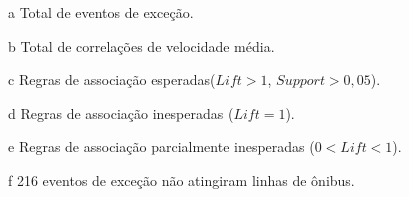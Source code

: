 \documentclass[
	12pt,				%
	oneside,			%
	a4paper,			%
	english,			%
	brazil				%
	]{abntex2ppgsi}
\begin{document}
{{{\begin{apendicesenv}
\begin{table}[!htb]
\begin{threeparttable}
\begin{tablenotes}
            \item[a] Total de eventos de exceção.
            \item[b] Total de correlações de velocidade média.
            \item[c] Regras de associação esperadas($Lift > 1$, $Support > 0,05$).
            \item[d] Regras de associação inesperadas ($Lift = 1$).
            \item[e] Regras de associação parcialmente inesperadas ($0 < Lift < 1$).
            \item[f] 216 eventos de exceção não atingiram linhas de ônibus.
        \end{tablenotes}
\end{threeparttable}
\end{table}



\end{apendicesenv}}}}
\end{document}
